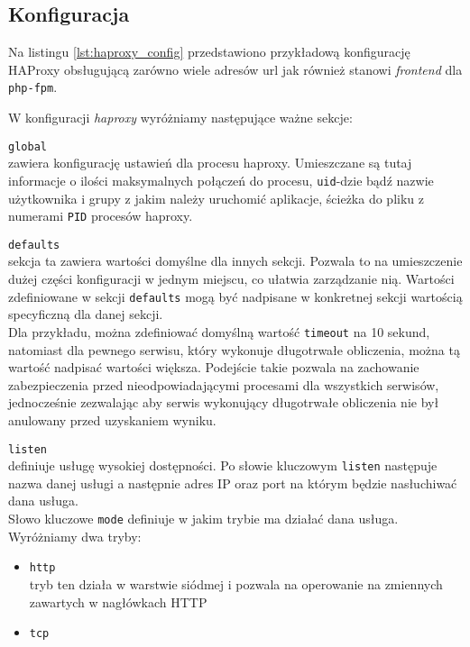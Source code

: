 {\subsection{Konfiguracja}
Na listingu  \ref{lst:haproxy_config} przedstawiono przykładową konfigurację HAProxy obsługującą zarówno wiele adresów url jak również stanowi \textit{frontend} dla \texttt{php-fpm}.

W konfiguracji \textit{haproxy} wyróżniamy następujące ważne sekcje:
\begin{description}
	\item{\texttt{global}}\\
		zawiera konfigurację ustawień dla procesu haproxy.
		Umieszczane są tutaj informacje o ilości maksymalnych połączeń do procesu, \texttt{uid}-dzie bądź nazwie użytkownika i grupy z jakim należy uruchomić aplikacje, ścieżka do pliku z numerami \texttt{PID} procesów haproxy.
	\item{\texttt{defaults}}\\
		sekcja ta zawiera wartości domyślne dla innych sekcji.
		Pozwala to na umieszczenie dużej części konfiguracji w jednym miejscu, co ułatwia zarządzanie nią.
		Wartości zdefiniowane w sekcji \texttt{defaults} mogą być nadpisane w konkretnej sekcji wartością specyficzną dla danej sekcji.\\
		Dla przykładu, można zdefiniować domyślną wartość \texttt{timeout} na 10 sekund, natomiast dla pewnego serwisu, który wykonuje długotrwałe obliczenia, można tą wartość nadpisać wartości większa.
		Podejście takie pozwala na zachowanie zabezpieczenia przed nieodpowiadającymi procesami dla wszystkich serwisów, jednocześnie zezwalając aby serwis wykonujący długotrwałe obliczenia nie był anulowany przed uzyskaniem wyniku.
	\item{\texttt{listen}}\\
		definiuje usługę wysokiej dostępności. Po słowie kluczowym \texttt{listen} następuje nazwa danej usługi a następnie adres IP oraz port na którym będzie nasłuchiwać dana usługa.\\
		Słowo kluczowe \texttt{mode} definiuje w jakim trybie ma działać dana usługa.
		Wyróżniamy dwa tryby:
		\begin{itemize}
			\item \texttt{http}\\
				tryb ten działa w warstwie siódmej i pozwala na operowanie na zmiennych zawartych w nagłówkach HTTP
			\item \texttt{tcp}\\

\end{itemize}
\end{description}}
